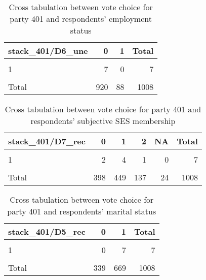 \documentclass[
]{article}
\begin{document}
\begin{table}

\caption{\label{tab:unnamed-chunk-35}Cross tabulation between vote choice for party 401 and respondents' employment status 
                   \label{table:crosstab_4_hr}}
\centering
\begin{tabular}[t]{l|r|r|r}
\hline
stack\_401/D6\_une & 0 & 1 & Total\\
\hline
\cellcolor{gray!6}{0} & \cellcolor{gray!6}{884} & \cellcolor{gray!6}{84} & \cellcolor{gray!6}{968}\\
\hline
1 & 7 & 0 & 7\\
\hline
\cellcolor{gray!6}{NA} & \cellcolor{gray!6}{29} & \cellcolor{gray!6}{4} & \cellcolor{gray!6}{33}\\
\hline
Total & 920 & 88 & 1008\\
\hline
\end{tabular}
\end{table}

\begin{table}

\caption{\label{tab:unnamed-chunk-35}Cross tabulation between vote choice for party 401 and respondents' subjective SES
                   membership \label{table:crosstab_5_hr}}
\centering
\begin{tabular}[t]{l|r|r|r|r|r}
\hline
stack\_401/D7\_rec & 0 & 1 & 2 & NA & Total\\
\hline
\cellcolor{gray!6}{0} & \cellcolor{gray!6}{383} & \cellcolor{gray!6}{429} & \cellcolor{gray!6}{133} & \cellcolor{gray!6}{23} & \cellcolor{gray!6}{968}\\
\hline
1 & 2 & 4 & 1 & 0 & 7\\
\hline
\cellcolor{gray!6}{NA} & \cellcolor{gray!6}{13} & \cellcolor{gray!6}{16} & \cellcolor{gray!6}{3} & \cellcolor{gray!6}{1} & \cellcolor{gray!6}{33}\\
\hline
Total & 398 & 449 & 137 & 24 & 1008\\
\hline
\end{tabular}
\end{table}

\begin{table}

\caption{\label{tab:unnamed-chunk-35}Cross tabulation between vote choice for party 401 and respondents' marital status
                  \label{table:crosstab_6_hr}}
\centering
\begin{tabular}[t]{l|r|r|r}
\hline
stack\_401/D5\_rec & 0 & 1 & Total\\
\hline
\cellcolor{gray!6}{0} & \cellcolor{gray!6}{330} & \cellcolor{gray!6}{638} & \cellcolor{gray!6}{968}\\
\hline
1 & 0 & 7 & 7\\
\hline
\cellcolor{gray!6}{NA} & \cellcolor{gray!6}{9} & \cellcolor{gray!6}{24} & \cellcolor{gray!6}{33}\\
\hline
Total & 339 & 669 & 1008\\
\hline
\end{tabular}
\end{table}
\end{document}
